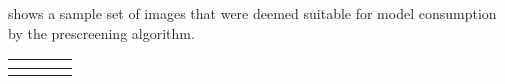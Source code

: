 \documentclass[letterpaper,10pt,english]{sphinxmanual}
\begin{document}
\sphinxAtStartPar
{} shows a sample set of images that were deemed suitable for model consumption by the prescreening algorithm.


\begin{savenotes}\sphinxattablestart
\centering
{}
\sphinxthecaptionisattop
{}\label{\detokenize{common/user_manual/dataPrep:id4}}\label{\detokenize{common/user_manual/dataPrep:id1}}
\sphinxaftertopcaption
\begin{tabulary}{\linewidth}[t]{|T|T|T|T|}
\hline
\begin{sphinxfigure-in-table}
\centering

\noindent{}
\end{sphinxfigure-in-table}\relax
&\begin{sphinxfigure-in-table}
\centering

\noindent{}
\end{sphinxfigure-in-table}\relax
&\begin{sphinxfigure-in-table}
\centering

\noindent{}
\end{sphinxfigure-in-table}\relax
&\begin{sphinxfigure-in-table}
\centering

\noindent{}
\end{sphinxfigure-in-table}\relax
\\
\hline\begin{sphinxfigure-in-table}
\centering

\noindent{}
\end{sphinxfigure-in-table}\relax
&\begin{sphinxfigure-in-table}
\centering

\noindent{}
\end{sphinxfigure-in-table}\relax
&\begin{sphinxfigure-in-table}
\centering

\noindent{}
\end{sphinxfigure-in-table}\relax
&\begin{sphinxfigure-in-table}
\centering

\noindent{}
\end{sphinxfigure-in-table}\relax
\\
\hline
\end{tabulary}
\par
\sphinxattableend\end{savenotes}
\end{document}
